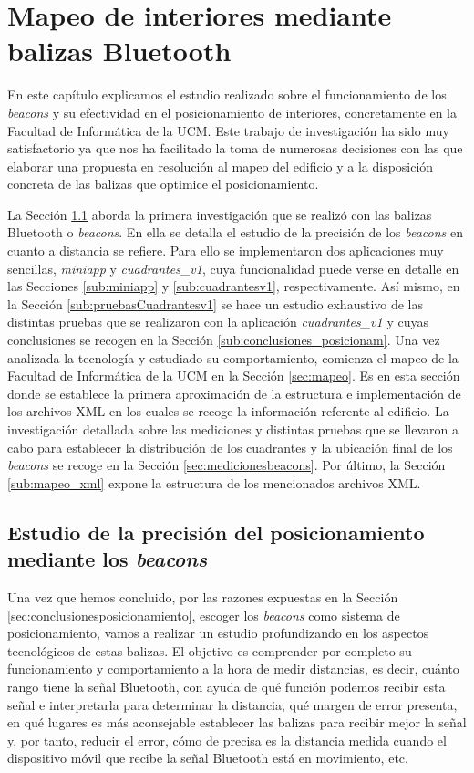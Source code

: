 \chapter{Mapeo de interiores mediante balizas Bluetooth}
\label{cap:descripcionTrabajo}

En este capítulo explicamos el estudio realizado sobre el funcionamiento de los \textit{beacons} y su efectividad en el posicionamiento de interiores, concretamente en la Facultad de Informática de la UCM. Este trabajo de investigación ha sido muy satisfactorio ya que nos ha facilitado la toma de numerosas decisiones con las que elaborar una propuesta en resolución al mapeo del edificio y a la disposición concreta de las balizas que optimice el posicionamiento. 

La Sección \ref{sec:estudioPrecisionBeacons} aborda la primera investigación que se realizó con las balizas Bluetooth o \textit{beacons}. En ella se detalla el estudio de la precisión de los \textit{beacons} en cuanto a distancia se refiere. Para ello se implementaron dos aplicaciones muy sencillas, \textit{miniapp} y \textit{cuadrantes\_v1}, cuya funcionalidad puede verse en detalle en las Secciones \ref{sub:miniapp} y \ref{sub:cuadrantesv1}, respectivamente. Así mismo, en la Sección \ref{sub:pruebasCuadrantesv1} se hace un estudio exhaustivo de las distintas pruebas que se realizaron con la aplicación \textit{cuadrantes\_v1} y cuyas conclusiones se recogen en la Sección \ref{sub:conclusiones_posicionam}. Una vez analizada la tecnología y estudiado su comportamiento, comienza el mapeo de la Facultad de Informática de la UCM en la Sección \ref{sec:mapeo}. Es en esta sección donde se establece la primera aproximación de la estructura e implementación de los archivos XML en los cuales se recoge la información referente al edificio. La investigación detallada sobre las mediciones y distintas pruebas que se llevaron a cabo para establecer la distribución de los cuadrantes y la ubicación final de los \textit{beacons} se recoge en la Sección \ref{sec:medicionesbeacons}. Por último, la Sección \ref{sub:mapeo_xml} expone la estructura de los mencionados archivos XML.


\section{Estudio de la precisión del posicionamiento mediante los \textit{beacons}}
\label{sec:estudioPrecisionBeacons}

Una vez que hemos concluido, por las razones expuestas en la Sección \ref{sec:conclusionesposicionamiento}, escoger los \textit{beacons} como sistema de posicionamiento, vamos a realizar un estudio profundizando en los aspectos tecnológicos de estas balizas. El objetivo es comprender por completo su funcionamiento y comportamiento a la hora de medir distancias, es decir, cuánto rango tiene la señal Bluetooth, con ayuda de qué función podemos recibir esta señal e interpretarla para determinar la distancia, qué margen de error presenta, en qué lugares es más aconsejable establecer las balizas para recibir mejor la señal y, por tanto, reducir el error, cómo de precisa es la distancia medida cuando el dispositivo móvil que recibe la señal Bluetooth está en movimiento, etc. 

